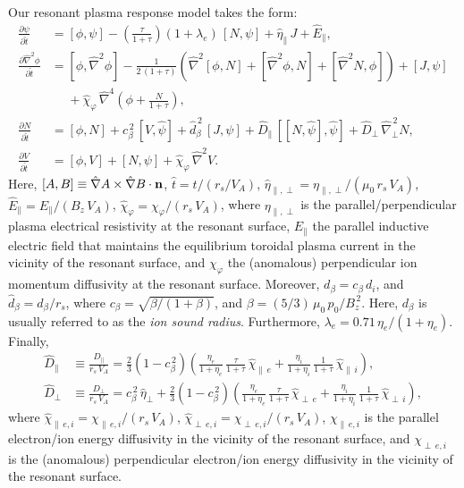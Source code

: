 \documentclass[12pt,prb,aps]{revtex4-1}
\begin{document}
Our resonant plasma response model takes the form:\,\cite{fw}
\begin{align}
\frac{\partial\psi}{\partial\hat{t}}&= [\phi,\psi] -\left(\frac{\tau}{1+\tau}\right)(1+\lambda_e)\,[N,\psi]
+\hat{\eta}_\parallel\,J + \hat{E}_\parallel,\\[0.5ex]
\frac{\partial \hat{\nabla}^2\phi}{\partial \hat{t}}&= [\phi,\hat{\nabla}^2\phi] - \frac{1}{2\,(1+\tau)}\left(\hat{\nabla}^2[\phi,N] + [\hat{\nabla}^2\phi,N] + [\hat{\nabla}^2 N,\phi]\right) + [J,\psi] \nonumber\\[0.5ex]&\phantom{=}+\hat{\chi}_\varphi  \,\hat{\nabla}^4\!\left(\phi + \frac{N}{1+\tau}\right), \\[0.5ex]
\frac{\partial N}{\partial \hat{t}}&= [\phi,N] +c_\beta^{\,2}\,[V,\hat{\psi}] +\hat{d}_\beta^{\,2}\,[J,\psi]
+ \hat{D}_\parallel \,[[N,\hat{\psi}],\hat{\psi}]+ \hat{D}_\perp\,\hat{\nabla}_\perp^{\,2}N,\\[0.5ex]
\frac{\partial V}{\partial\hat{t}}&= [\phi,V] +[N,\psi] + \hat{\chi}_\varphi\,\hat{\nabla}^2 V.\label{e21}
\end{align}
Here, $[A,B]\equiv \hat{\nabla} A\times \hat{\nabla} B\cdot {\bf n}$, $\hat{t} = t/(r_s/V_A)$, $\hat{\eta}_{\parallel,\perp} = \eta_{\parallel,\perp}/(\mu_0\,r_s\,V_A)$, $\hat{E}_\parallel = E_\parallel/(B_z\,V_A)$, 
$\hat{\chi}_\varphi= \chi_\varphi/(r_s\,V_A)$, where $\eta_{\parallel,\perp}$ is the parallel/perpendicular plasma electrical
resistivity at the resonant surface, $E_\parallel$ the parallel inductive electric field that maintains the equilibrium toroidal
plasma current in the vicinity of the resonant surface, and $\chi_\varphi$  the (anomalous) perpendicular ion momentum
diffusivity at the resonant surface. 
Moreover, $d_\beta=c_\beta\,d_i$, and $\hat{d}_\beta=d_\beta/r_s$, where $c_\beta = \sqrt{\beta/(1+\beta)}$, and
$\beta=(5/3)\,\mu_0\,p_0/B_z^{\,2}$. Here, $d_\beta$ is usually referred to as the {\em ion sound radius}. Furthermore,
$\lambda_e=0.71\,\eta_e/(1+\eta_e)$. Finally,\cite{fw}
\begin{align}
\hat{D}_\parallel&\equiv\frac{D_{\parallel}}{r_s\,V_A}= \frac{2}{3}\left(1-c_\beta^{\,2}\right)\!\left(\frac{\eta_e}{1+\eta_e}\,\frac{\tau}{1+\tau}\,\hat{\chi}_{\parallel\,e} + \frac{\eta_i}{1+\eta_i}\,\frac{1}{1+\tau}\,\hat{\chi}_{\parallel\,i}\right),\\[0.5ex]
\hat{D}_\perp& \equiv \frac{D_{\perp}}{r_s\,V_A}= c_\beta^{\,2}\,\hat{\eta}_\perp +  \frac{2}{3}\left(1-c_\beta^{\,2}\right)\!\left(\frac{\eta_e}{1+\eta_e}\,\frac{\tau}{1+\tau}\,\hat{\chi}_{\perp\,e} + \frac{\eta_i}{1+\eta_i}\,\frac{1}{1+\tau}\,\hat{\chi}_{\perp\,i}\right),
\end{align}
where $\hat{\chi}_{\parallel\,e,i}=\chi_{\parallel\,e,i}/(r_s\,V_A)$,  $\hat{\chi}_{\perp\,e,i}=\chi_{\perp\,e,i}/(r_s\,V_A)$, 
$\chi_{\parallel\,e,i}$ is the parallel electron/ion energy diffusivity in the vicinity of the resonant surface, and 
$\chi_{\perp\,e,i}$ is the (anomalous) perpendicular
electron/ion  energy diffusivity in the vicinity of the resonant surface. 
\end{document}
